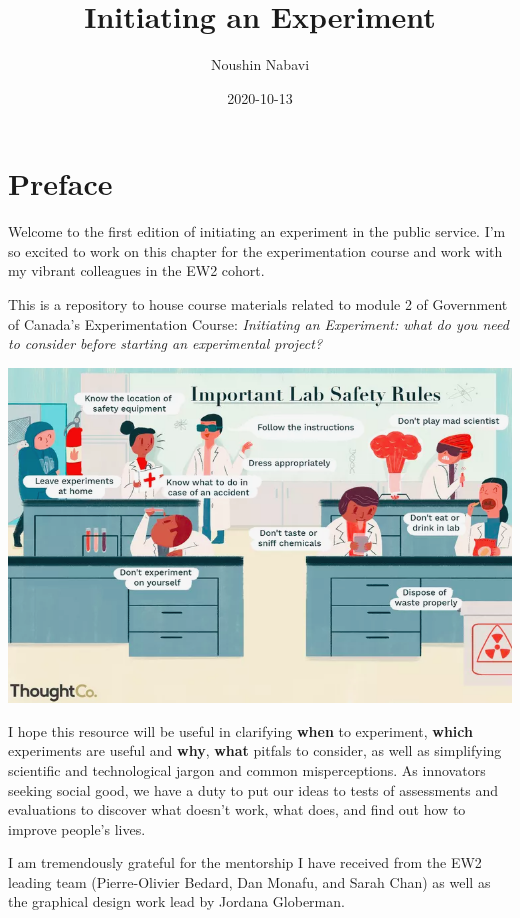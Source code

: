 \documentclass[openany]{book}
\title{Initiating an Experiment}
\author{Noushin Nabavi}
\date{2020-10-13}
\begin{document}
\maketitle

{
\setcounter{tocdepth}{1}
\tableofcontents
}
\hypertarget{preface}{%
\chapter*{Preface}\label{preface}}

Welcome to the first edition of initiating an experiment in the public service. I'm so excited to work on this chapter for the experimentation course and work with my vibrant colleagues in the EW2 cohort.

This is a repository to house course materials related to module 2 of Government of Canada's Experimentation Course: \emph{Initiating an Experiment: what do you need to consider before starting an experimental project?}

\includegraphics{fig/experimentation-rules.png}

I hope this resource will be useful in clarifying \textbf{when} to experiment, \textbf{which} experiments are useful and \textbf{why}, \textbf{what} pitfals to consider, as well as simplifying scientific and technological jargon and common misperceptions. As innovators seeking social good, we have a duty to put our ideas to tests of assessments and evaluations to discover what doesn't work, what does, and find out how to improve people's lives.

I am tremendously grateful for the mentorship I have received from the EW2 leading team (Pierre-Olivier Bedard, Dan Monafu, and Sarah Chan) as well as the graphical design work lead by Jordana Globerman.
\end{document}

